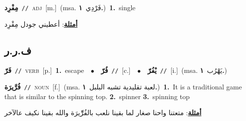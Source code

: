 \documentclass[10pt,a4paper,twoside]{article} %
\begin{document}
\begin{multicols}{2}
{\setlength\topsep{0pt}\textbf{\foreignlanguage{arabic}{مِفْرِد}}\ {\color{gray}\texttt{//}\color{black}}\ \textsc{adj}\ [m.]\ \color{gray}(msa. \foreignlanguage{arabic}{فَرْدِي}~\foreignlanguage{arabic}{\textbf{١.}})\color{black}\ \textbf{1.}~single\  \begin{flushright}\color{gray}\foreignlanguage{arabic}{\textbf{\underline{\foreignlanguage{arabic}{أمثلة}}}: أعطيني جودل مِفْرِد}\end{flushright}\color{black}} \vspace{2mm}

\vspace{-3mm}
\subsection*{\color{blue}\foreignlanguage{arabic}{ف.ر.ر}\color{blue}{}} 

{\setlength\topsep{0pt}\textbf{\foreignlanguage{arabic}{فَرّ}}\ {\color{gray}\texttt{//}\color{black}}\ \textsc{verb}\ [p.]\ \textbf{1.}~escape\ \ $\bullet$\ \ \setlength\topsep{0pt}\textbf{\foreignlanguage{arabic}{فُرّ}}\ {\color{gray}\texttt{//}\color{black}}\ [c.]\ \ $\bullet$\ \ \setlength\topsep{0pt}\textbf{\foreignlanguage{arabic}{يْفُرّ}}\ {\color{gray}\texttt{//}\color{black}}\ [i.]\ \color{gray}(msa. \foreignlanguage{arabic}{يَهْرُب}~\foreignlanguage{arabic}{\textbf{١.}})\color{black}\ } \vspace{2mm}

{\setlength\topsep{0pt}\textbf{\foreignlanguage{arabic}{فُرَّيرَة}}\ {\color{gray}\texttt{//}\color{black}}\ \textsc{noun}\ [f.]\ \color{gray}(msa. \foreignlanguage{arabic}{لعبة تقليدية تشبه البلبل}~\foreignlanguage{arabic}{\textbf{١.}})\color{black}\ \textbf{1.}~It is a traditional game that is similar to the spinning top.  \textbf{2.}~spinner  \textbf{3.}~spinning top\  \begin{flushright}\color{gray}\foreignlanguage{arabic}{\textbf{\underline{\foreignlanguage{arabic}{أمثلة}}}: متعتنا واحنا صغار لما بقينا نلعب بالفُرِّْيرَة والله بقينا نكيف عالآخر}\end{flushright}\color{black}} \vspace{2mm}


\end{multicols}
\end{document}
